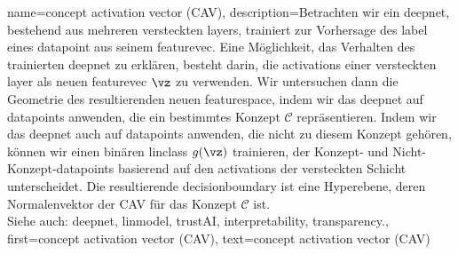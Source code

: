 {{{{
{name={concept activation vector (CAV)},
	description={Betrachten wir ein \gls{deepnet}, bestehend aus mehreren versteckten \glspl{layer}, 
		trainiert zur Vorhersage des \gls{label} eines \gls{datapoint} aus seinem \gls{featurevec}. Eine Möglichkeit,
		 das Verhalten des trainierten \gls{deepnet} zu erklären, besteht darin, die \glspl{activation} einer
		  versteckten \gls{layer} als neuen \gls{featurevec} $\vz$ zu verwenden. Wir untersuchen dann die Geometrie 
		  des resultierenden neuen \gls{featurespace}, indem wir das \gls{deepnet} auf \glspl{datapoint} anwenden,
		   die ein bestimmtes Konzept $\mathcal{C}$ repräsentieren. Indem wir das \gls{deepnet} auch auf 
		   \glspl{datapoint} anwenden, die nicht zu diesem Konzept gehören, können wir einen binären 
		   \gls{linclass} $g(\vz)$ trainieren, der Konzept- und Nicht-Konzept-\glspl{datapoint} basierend auf 
		   den \glspl{activation} der versteckten Schicht unterscheidet. Die resultierende \gls{decisionboundary}
		    ist eine Hyperebene, deren Normalenvektor der CAV für das Konzept $\mathcal{C}$ ist. 
				\\
		Siehe auch: \gls{deepnet}, \gls{linmodel}, \gls{trustAI}, \gls{interpretability}, \gls{transparency}.}, 
	first={concept activation vector (CAV)},
	text={concept activation vector (CAV)}
}

}}}}
